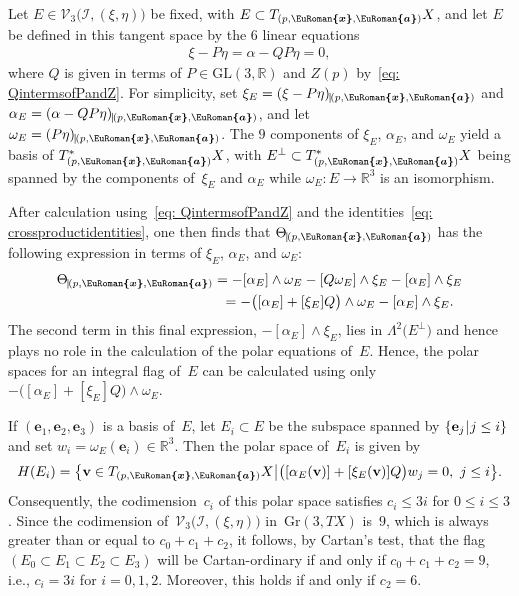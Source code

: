 \documentclass[11pt]{article}
\numberwithin{equation}{section}
\newcommand{\eurom}{\EuRoman}
\newcommand{\cI}{{\mathcal I}}
\newcommand{\cV}{{\mathcal V}}
\newcommand{\bbR}{{\mathbb R}}
\newcommand{\mbe}{\mathbf{e}}
\newcommand{\mbv}{\mathbf{v}}
\newcommand{\euroa}{\bm{\eurom{a}}}
\newcommand{\eurox}{\bm{\eurom{x}}}
\begin{document}
Let $E\in\cV_3\bigl(\cI,(\xi,\eta)\bigr)$ be fixed, with $E\subset T_{(p,\eurox,\euroa)}X$, and let $E$ be defined in this tangent space by the $6$ linear equations
\begin{gather}\label{eq: E in PQterms}
\xi - P \eta = \alpha - QP \eta = 0,
\end{gather}
where $Q$ is given in terms of $P\in\mathrm{GL}(3,\mathbb{R})$ and $Z(p)$ by~\eqref{eq: QintermsofPandZ}. For simplicity, set $\xi_E = (\xi - P \eta)_{\vrule(p,\eurox,\euroa)}$
and $\alpha_E = (\alpha - QP \eta)_{\vrule(p,\eurox,\euroa)}$, and let $\omega_E = (P \eta)_{\vrule(p,\eurox,\euroa)}$. The $9$ components of $\xi_E$, $\alpha_E$, and $\omega_E$ yield a basis of $T^*_{(p,\eurox,\euroa)}X$, with $E^\perp\subset T^*_{(p,\eurox,\euroa)}X$ being spanned by the components of~$\xi_E$ and $\alpha_E$ while $\omega_E\colon E\to\bbR^3$ is an isomorphism.

After calculation using~\eqref{eq: QintermsofPandZ} and the identities~\eqref{eq: crossproductidentities}, one then finds that $\Theta_{\vrule(p,\eurox,\euroa)}$ has the following expression in terms of $\xi_E$, $\alpha_E$, and $\omega_E$:
\begin{gather*}
\Theta_{\vrule(p,\eurox,\euroa)} = - [\alpha_E ]\wedge \omega_E
- [Q \omega_E ]\wedge \xi_E - [\alpha_E ]\wedge \xi_E\\
\hphantom{\Theta_{\vrule(p,\eurox,\euroa)}}{} =-\bigl( [\alpha_E ]+ [\xi_E ]Q\big)\wedge\omega_E
 - \left[\alpha_E\right]\wedge \xi_E .
\end{gather*}
The second term in this final expression, $- [\alpha_E ]\wedge \xi_E$, lies in $\Lambda^2\big(E^\perp\big)$ and hence plays no role in the calculation of the polar equations of~$E$. Hence, the polar spaces for an integral flag of~$E$ can be calculated using only $-\bigl( [\alpha_E ]+ [\xi_E ]Q\big)\wedge\omega_E$.

If $(\mbe_1,\mbe_2,\mbe_3)$ is a basis of~$E$, let $E_i\subset E$ be the subspace spanned by $\{ \mbe_j\, \vrule \, j\le i \}$ and set $w_i = \omega_E(\mbe_i)\in\bbR^3$.
Then the polar space of~$E_i$ is given by
\begin{gather*}
H(E_i) = \big\{\mbv\in T_{(p,\eurox,\euroa)}X\, \vrule\, \big( [\alpha_E(\mbv) ]+ [\xi_E(\mbv) ]Q\big)w_j =0, \ j\le i\big\}.
\end{gather*}
Consequently, the codimension~$c_i$ of this polar space
satisfies $c_i \le 3i$ for $0\le i\le 3$. Since the codimension
of~$\cV_3\bigl(\cI,(\xi,\eta)\bigr)$ in~$\mathrm{Gr}(3,TX)$ is~$9$,
which is always greater than or equal to $c_0 + c_1 + c_2$,
it follows, by Cartan's test, that the flag
$(E_0\subset E_1\subset E_2\subset E_3)$
will be Cartan-ordinary if and only if $c_0+c_1+c_2=9$,
i.e., $c_i = 3i$ for $i = 0,1,2$.
Moreover, this holds if and only if $c_2 = 6$.
\end{document}
